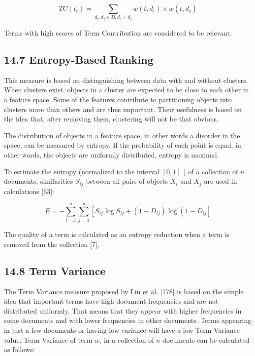 \documentclass[10pt]{book}
\begin{document}
\begin{equation*}
T C\left(t_{t}\right)=\sum_{d_{i}, d_{j} \in D, d_{i} \neq d_{j}} w\left(t, d_{i}\right) \times w\left(t, d_{j}\right) \tag{14.24}
\end{equation*}


Terms with high scores of Term Contribution are considered to be relevant.

\subsection*{14.7 Entropy-Based Ranking}
This measure is based on distinguishing between data with and without clusters. When clusters exist, objects in a cluster are expected to be close to each other in a feature space. Some of the features contribute to partitioning objects into clusters more than others and are thus important. Their usefulness is based on the idea that, after removing them, clustering will not be that obvious.

The distribution of objects in a feature space, in other words a disorder in the space, can be measured by entropy. If the probability of each point is equal, in other words, the objects are uniformly distributed, entropy is maximal.

To estimate the entropy (normalized to the interval $[0,1]$ ) of a collection of $n$ documents, similarities $S_{i j}$ between all pairs of objects $X_{i}$ and $X_{j}$ are used in calculations [63]:


\begin{equation*}
E=-\sum_{i=1}^{n} \sum_{j=1}^{n}\left[S_{i j} \log S_{i j}+\left(1-D_{i j}\right) \log \left(1-D_{i j}\right]\right. \tag{14.25}
\end{equation*}


The quality of a term is calculated as an entropy reduction when a term is removed from the collection [7].

\subsection*{14.8 Term Variance}
The Term Variance measure proposed by Liu et al. [178] is based on the simple idea that important terms have high document frequencies and are not distributed uniformly. That means that they appear with higher frequencies in some documents and with lower frequencies in other documents. Terms appearing in just a few documents or having low variance will have a low Term Variance value. Term Variance of term $w_{i}$ in a collection of $n$ documents can be calculated as follows:
\end{document}
